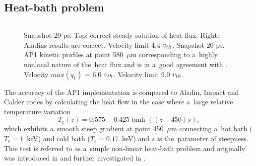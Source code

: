 \subsection{Heat-bath problem}  
\label{sec:heatbath_test}

\begin{figure}[tbh]
  \begin{center}
    \begin{tabular}{c}
    \end{tabular}
  \caption{  
  Snapshot 20 ps. Top: correct steady solution of heat flux. 
  Right: Aladins results are correct. Velocity limit 4.4 $v_{th}$.
  Snapshot 20 ps. AP1 kinetic profiles at point 580~$\mu$m corresponding to 
  a~highly nonlocal nature of the~heat flux %
  and is in a~good agreement with
  \cite{Sherlock_PoP2017}. Velocity $max(q_1)$ = 6.0 $v_{th}$. 
  Velocity limit 9.0 $v_{th}$.
  }
  \label{fig:C7_Aladin_case5}
  \end{center} 
\end{figure}

The accuracy of the AP1 implementation is compared to Aladin, Impact and Calder
codes by calculating the heat flow in the case
where a~large relative temperature variation
\begin{equation}
  T_e(z) = 0.575 - 0.425 \tanh\left((z-450) s\right) ,
  \label{eq:T_init}
\end{equation}
which exhibits a~smooth steep gradient at point 450~$\mu$m 
connecting a~hot bath ($T_e = 1$~keV) 
and cold bath ($T_e = 0.17$~keV) and $s$ is the~parameter of steepness. 
This test is referred to as a~simple non-linear heat-bath problem and
originally was introduced in \cite{marocchino2013} and further investigated
in  \cite{Sorbo_2015, Sorbo_2016, Sherlock_PoP2017, Brodrick_PoP2017}.


